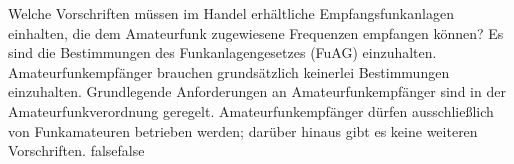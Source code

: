     {Welche Vorschriften müssen im Handel erhältliche Empfangsfunkanlagen einhalten, die dem Amateurfunk zugewiesene Frequenzen empfangen können?}
    {Es sind die Bestimmungen des Funkanlagengesetzes (FuAG) einzuhalten.}
    {Amateurfunkempfänger brauchen grundsätzlich keinerlei Bestimmungen einzuhalten.}
    {Grundlegende Anforderungen an Amateurfunkempfänger sind in der Amateurfunkverordnung geregelt.}
    {Amateurfunkempfänger dürfen ausschließlich von Funkamateuren betrieben werden; darüber hinaus gibt es keine weiteren Vorschriften.}
    {false}{false}